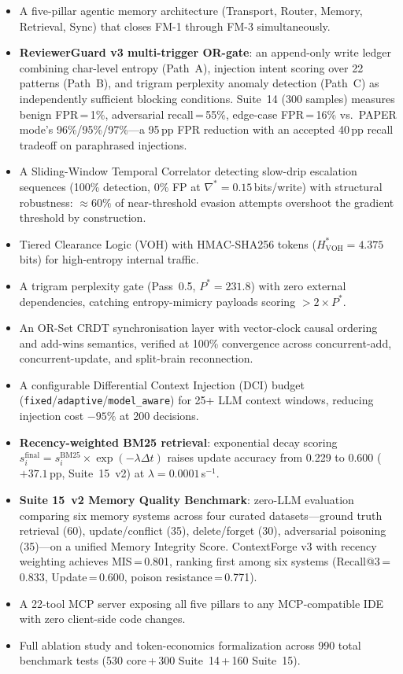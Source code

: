 \documentclass[11pt,twocolumn]{article}
\begin{document}
\begin{itemize}[leftmargin=*,topsep=2pt,itemsep=2pt]
  \item A five-pillar agentic memory architecture (Transport, Router, Memory,
    Retrieval, Sync) that closes FM-1 through FM-3 simultaneously.
  \item \textbf{ReviewerGuard v3 multi-trigger OR-gate}: an append-only
    write ledger combining char-level entropy (Path~A), injection intent scoring
    over 22 patterns (Path~B), and trigram perplexity anomaly detection (Path~C)
    as independently sufficient blocking conditions. Suite~14 (300 samples)
    measures benign FPR\,=\,1\%, adversarial recall\,=\,55\%, edge-case
    FPR\,=\,16\% vs.\ PAPER mode's 96\%/95\%/97\%---a 95\,pp FPR reduction
    with an accepted 40\,pp recall tradeoff on paraphrased injections.
  \item A Sliding-Window Temporal Correlator detecting slow-drip escalation
    sequences (100\% detection, 0\% FP at $\nabla^{*}\!=\!0.15$\,bits/write)
    with structural robustness: ${\approx}60\%$ of near-threshold evasion
    attempts overshoot the gradient threshold by construction.
  \item Tiered Clearance Logic (VOH) with HMAC-SHA256 tokens
    ($H^{*}_{\mathrm{VOH}} = 4.375$\,bits) for high-entropy internal traffic.
  \item A trigram perplexity gate (Pass~0.5, $P^{*}=231.8$) with zero external
    dependencies, catching entropy-mimicry payloads scoring $>2\times P^{*}$.
  \item An OR-Set CRDT synchronisation layer with vector-clock causal ordering
    and add-wins semantics, verified at 100\% convergence across
    concurrent-add, concurrent-update, and split-brain reconnection.
  \item A configurable Differential Context Injection (DCI) budget
    (\texttt{fixed}/\texttt{adaptive}/\texttt{model\_aware}) for 25+
    LLM context windows, reducing injection cost $-95\%$ at 200 decisions.
  \item \textbf{Recency-weighted BM25 retrieval}: exponential decay scoring
    $s^{\mathrm{final}}_i = s^{\mathrm{BM25}}_i \times \exp(-\lambda\Delta t)$
    raises update accuracy from 0.229 to 0.600 ($+37.1$\,pp, Suite~15~v2)
    at $\lambda=0.0001$\,s$^{-1}$.
  \item \textbf{Suite 15~v2 Memory Quality Benchmark}: zero-LLM evaluation
    comparing six memory systems across four curated datasets---ground
    truth retrieval (60), update/conflict (35), delete/forget (30), adversarial
    poisoning (35)---on a unified Memory Integrity Score.  ContextForge v3
    with recency weighting achieves MIS\,=\,0.801, ranking first among six
    systems (Recall@3\,=\,0.833, Update\,=\,0.600, poison resistance\,=\,0.771).
  \item A 22-tool MCP server exposing all five pillars to any MCP-compatible
    IDE with zero client-side code changes.
  \item Full ablation study and token-economics formalization across 990 total
    benchmark tests (530 core\,+\,300 Suite~14\,+\,160 Suite~15).
\end{itemize}
\end{document}
